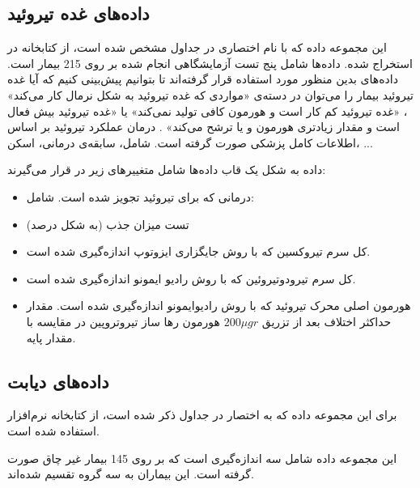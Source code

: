 \subsection{
داده‌های غده تیروئید
}

این مجموعه داده که با نام اختصاری 
در جداول مشخص شده است، از کتابخانه
\cite{rmclust}
در 
استخراج شده. داده‌ها شامل پنج تست آزمایشگاهی انجام شده بر روی 215 بیمار است. داده‌های بدین منظور مورد استفاده قرار گرفته‌اند تا بتوانیم پیش‌بینی کنیم که آیا غده تیروئید بیمار را می‌توان در دسته‌ی «مواردی که غده تیروئید به شکل نرمال کار می‌کند»
، «غده تیروئید کم کار است و هورمون کافی تولید نمی‌کند»
یا «غده تیروئید بیش فعال است و مقدار زیادتری هورمون 
و یا
ترشح می‌کند»
. درمان عملکرد تیروئید بر اساس اطلاعات کامل پزشکی صورت گرفته است. شامل، سابقه‌ی درمانی، اسکن، ...

داده به شکل یک قاب دا‌ده‌ها
شامل متغییر‌های زیر در 
قرار می‌گیرند:
\begin{itemize}
\item
{}
درمانی که برای تیروئید تجویز شده است. شامل:
\item
{}
تست میزان جذب 
(به شکل درصد)
\item
{}
کل سرم تیروکسین که با روش جایگزاری ایزوتوپ
اندازه‌گیری شده است.
\item
{}
کل سرم تیرودوتیروئین 
که با روش رادیو ایمونو
اندازه‌گیری شده است.
\item
{}
هورمون اصلی محرک تیروئید که با روش رادیوایمونو اندازه‌گیری شده است.
مقدار حداکثر اختلاف
بعد از تزریق
$200 \mu gr$
هورمون رها ساز تیروتروپین
در مقایسه با مقدار پایه.
\end{itemize}


\subsection{
داده‌های دیابت
}

برای این مجموعه داده که به اختصار 
در جداول ذکر شده است، از کتابخانه
\cite{rmclust}
نرم‌افزار 
استفاده شده است.

این مجموعه داده شامل سه اندازه‌گیری است که بر روی 145 بیمار غیر چاق صورت گرفته است. این بیماران به سه گروه تقسیم شده‌اند.

